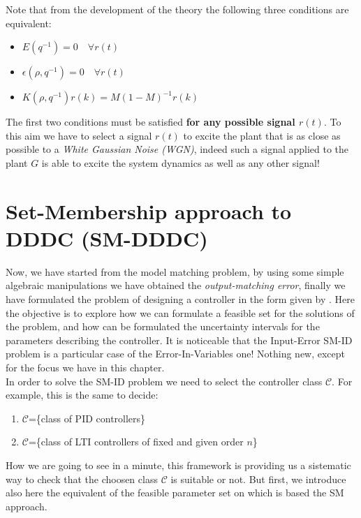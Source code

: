 \begin{remark}
    Note that from the development of the theory the following three conditions are equivalent:
    \begin{itemize}
        \itemsep-0.3em
        \item $E(q^{-1})=0 \quad \forall r(t)$
        \item $\epsilon(\rho,q^{-1})=0 \quad \forall r(t)$
        \item $K(\rho,q^{-1})r(k)=M (1-M)^{-1} r(k)$
    \end{itemize}
\end{remark}

\begin{remark}
    The first two conditions must be satisfied \textbf{for any possible signal $r(t)$}. To this aim we have to select a signal $r(t)$ to excite the plant that is as close as possible to a \textit{White Gaussian Noise (WGN)}, indeed such a signal applied to the plant $G$ is able to excite the system dynamics as well as any other signal!
\end{remark}

\section{Set-Membership approach to DDDC (SM-DDDC)}
Now, we have started from the model matching problem, by using some simple algebraic manipulations we have obtained the \textit{output-matching error}, finally we have formulated the problem of designing a controller in the form given by . Here the objective is to explore how we can formulate a feasible set for the solutions of the problem, and how can be formulated the uncertainty intervals for the parameters describing the controller. It is noticeable that the Input-Error SM-ID problem is a particular case of the Error-In-Variables one! Nothing new, except for the focus we have in this chapter.\\

\noindent
In order to solve the SM-ID problem we need to select the controller class $\mathcal{C}$. For example, this is the same to decide: 
\begin{enumerate}
    \itemsep-0.3em
    \item $\mathcal{C}$=\{class of PID controllers\}
    \item $\mathcal{C}$=\{class of LTI controllers  of fixed and given order $n$\}
\end{enumerate}

How we are going to see in a minute, this framework is providing us a sistematic way to check that the choosen class $\mathcal{C}$ is suitable or not. But first, we introduce also here the equivalent of the feasible parameter set on which is based the SM approach.

